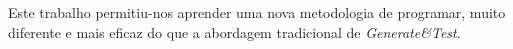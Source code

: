 Este trabalho permitiu-nos aprender uma nova metodologia de programar, muito diferente e mais eficaz do que a abordagem tradicional de \textit{Generate&Test}.
